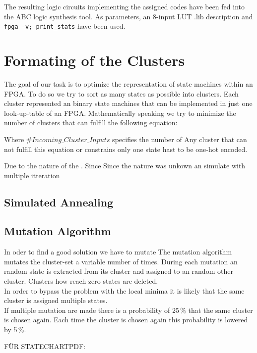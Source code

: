 The resulting logic circuits implementing the assigned codes have been fed into the ABC logic synthesis tool. As parameters, an 8-input LUT .lib description and \texttt{fpga -v; print\_stats} have been used.




\section{Formating of the Clusters}
\label{subsubsec:format_clusters}

The goal of our task is to optimize the representation of state machines within an FPGA.
To do so we try to sort as many states as possible into clusters. Each cluster represented an binary state machines that can be implemented in just one look-up-table of an FPGA. 
Mathematically speaking we try to minimize the number of clusters that can fulfill the following equation:


Where $ \#Incoming\_Cluster\_Inputs $ specifies the number of 
Any cluster that can not fulfill this equation or constrains only one state hast to be one-hot encoded. 



Due to the nature of the . Since 
Since the nature was unkown an simulate with multiple itteration

\subsection{Simulated Annealing}
\label{subsubsec:format_clusters}


\subsection{Mutation Algorithm}
\label{subsubsec:format_clusters}

In oder to find a good solution we have to mutate
The mutation algorithm mutates the cluster-set a variable number of times.
During each mutation an random state is extracted from its cluster and assigned to an random other cluster. Clusters how reach zero states are deleted. \\
In order to bypass the problem with the local minima it is likely that the same cluster is assigned multiple states.\\
If multiple mutation are made there is a probability of 25\,\% that the same cluster is chosen again. Each time the cluster is chosen again this probability is lowered by 5\,\%.




FÜR STATECHARTPDF:



